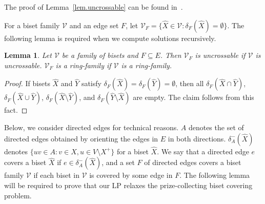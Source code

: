 \documentclass[11pt]{article}
\newtheorem{lemma}{Lemma}
\newcommand{\Vfam}{\mathcal{V}}
\begin{document}
The proof of Lemma~\ref{lem.uncrossable} can be found
in~\cite{Nutov12uncrossable}. 

For a biset family $\Vfam$ and an edge set $F$, let $\Vfam_F=\{\hat{X}
\in \Vfam\colon \delta_F(\hat{X})=\emptyset\}$.
The following lemma is required when we compute solutions recursively.

\begin{lemma}\label{lem.residual-uncrossable}
 Let $\Vfam$ be a family of bisets and $F\subseteq E$.
 Then $\Vfam_F$ is
 uncrossable if $\Vfam$ is uncrossable.
 $\Vfam_F$ is a ring-family if $\Vfam$ is a ring-family.
\end{lemma}
\begin{proof}
If bisets $\hat{X}$ and $\hat{Y}$ satisfy
$\delta_F(\hat{X})=\delta_F(\hat{Y})=\emptyset$,
then 
all $\delta_F(\hat{X}\cap \hat{Y})$, $\delta_F(\hat{X}\cup \hat{Y})$,
$\delta_F(\hat{X}\setminus \hat{Y})$, and $\delta_F(\hat{Y}\setminus
 \hat{X})$
are empty.
The claim follows from this fact.
\end{proof}


Below, we consider directed edges for technical reasons.
$A$ denotes the set of directed edges obtained by orienting the edges
in $E$ in both directions.
$\delta^-_A(\hat{X})$ denotes $\{uv \in A\colon v \in X, u \in V
\setminus X^+\}$ for a biset $\hat{X}$.
We say that a directed edge $e$ covers a biset $\hat{X}$ if $e \in
\delta^-_A(\hat{X})$,
and a set $F$ of directed edges covers a biset family $\Vfam$ if each
biset in $\Vfam$ is covered by some edge in $F$.
The following lemma will be required to prove that our LP relaxes the
prize-collecting biset covering problem.
\end{document}
